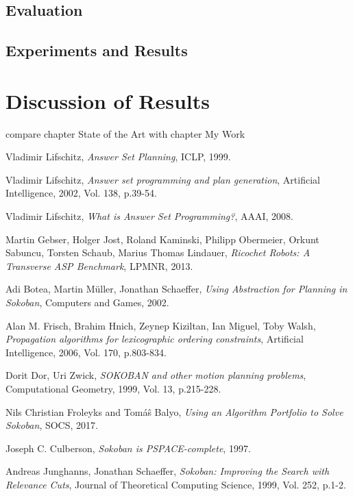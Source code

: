 \documentclass{report}
\begin{document}
\section{Evaluation}


\section{Experiments and Results}


\chapter{Discussion of Results}
compare chapter State of the Art with chapter My Work \cite{LifschitzASP}



\begin{thebibliography}{}
Vladimir Lifschitz,
\textit{Answer Set Planning},
ICLP, 1999.

Vladimir Lifschitz,
\textit{Answer set programming and plan generation},
Artificial Intelligence, 2002, Vol. 138, p.39-54.

Vladimir Lifschitz,
\textit{What is Answer Set Programming?},
AAAI, 2008.

Martin Gebser, Holger Jost, Roland Kaminski, Philipp Obermeier, Orkunt Sabuncu, Torsten Schaub, Marius Thomas Lindauer,
\textit{Ricochet Robots: A Transverse ASP Benchmark},
LPMNR, 2013.

Adi Botea, Martin Müller, Jonathan Schaeffer,
\textit{Using Abstraction for Planning in Sokoban},
Computers and Games, 2002.

Alan M. Frisch, Brahim Hnich, Zeynep Kiziltan, Ian Miguel, Toby Walsh,
\textit{Propagation algorithms for lexicographic ordering constraints},
Artificial Intelligence, 2006, Vol. 170, p.803-834.

Dorit Dor, Uri Zwick,
\textit{SOKOBAN and other motion planning problems},
Computational Geometry, 1999, Vol. 13, p.215-228.

Nils Christian Froleyks and Tom{\'a}{\^s} Balyo,
\textit{Using an Algorithm Portfolio to Solve Sokoban},
SOCS, 2017.

Joseph C. Culberson,
\textit{Sokoban is PSPACE-complete},
1997.

Andreas Junghanns, Jonathan Schaeffer,
\textit{Sokoban: Improving the Search with Relevance Cuts},
Journal of Theoretical Computing Science, 1999, Vol. 252, p.1-2.


\end{thebibliography}
\end{document}
